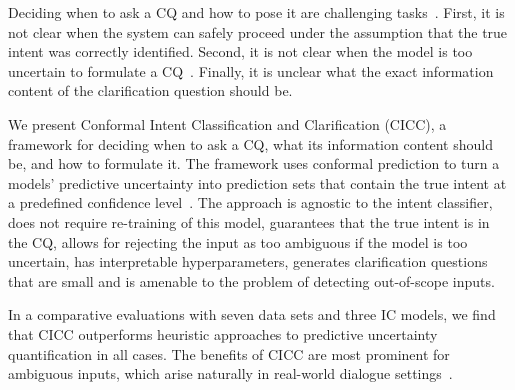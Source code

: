 \documentclass[11pt]{article}
\begin{document}
Deciding when to ask a CQ and how to pose it are challenging tasks~\citep{devault2007managing,keyvan2022approach}. First, it is not clear when the system can safely proceed under the assumption that the true intent was correctly identified. Second, it is not clear when the model is too uncertain to formulate a CQ~\citep{cavalin2020improving}. Finally, it is unclear what the exact information content of the clarification question should be.


We present Conformal Intent Classification and Clarification (CICC), a framework for deciding when to ask a CQ, what its information content should be, and how to formulate it. The framework uses conformal prediction to turn a models' predictive uncertainty into
prediction sets that contain the true intent at a predefined confidence level~\citep{shafer2008tutorial,angelopoulos2023conformal}. The approach is agnostic to the intent classifier, does not require re-training of this model, guarantees that the true intent is in the CQ, allows for rejecting the input as too ambiguous if the model is too uncertain, has interpretable hyperparameters, generates clarification questions that are small and is amenable to the problem of detecting out-of-scope inputs.


In a comparative evaluations with seven data sets and three IC models,
we find that CICC outperforms heuristic approaches to predictive uncertainty quantification in all cases. The benefits of CICC are most prominent for ambiguous inputs, which arise naturally in real-world dialogue settings~\citep{zamani2020generating,larson-etal-2019-evaluation}.
\end{document}
